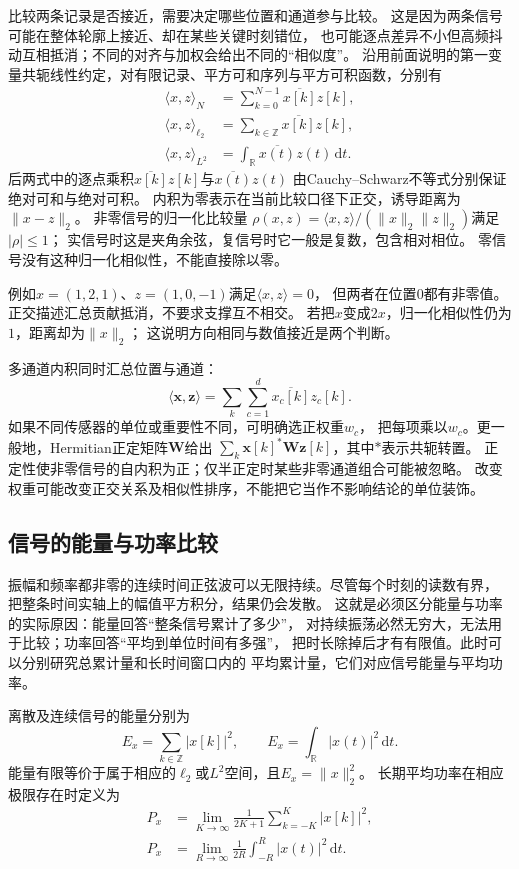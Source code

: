 比较两条记录是否接近，需要决定哪些位置和通道参与比较。
这是因为两条信号可能在整体轮廓上接近、却在某些关键时刻错位，
也可能逐点差异不小但高频抖动互相抵消；不同的对齐与加权会给出不同的“相似度”。
沿用前面说明的第一变量共轭线性约定，对有限记录、平方可和序列与平方可积函数，分别有
\begin{equation}
  \begin{aligned}
    \langle x,z\rangle_N&=\sum_{k=0}^{N-1}\overline{x[k]}z[k],\\
    \langle x,z\rangle_{\ell_2}&=\sum_{k\in\mathbb Z}\overline{x[k]}z[k],\\
    \langle x,z\rangle_{L^2}&=\int_{\mathbb R}\overline{x(t)}z(t)\,\mathrm dt.
  \end{aligned}
  \label{eq:signal-inner-products}
\end{equation}
后两式中的逐点乘积$\overline{x[k]}z[k]$与$\overline{x(t)}z(t)$
由Cauchy--Schwarz不等式分别保证绝对可和与绝对可积。
内积为零表示在当前比较口径下正交，诱导距离为$\|x-z\|_2$。
非零信号的归一化比较量
$\rho(x,z)=\langle x,z\rangle/(\|x\|_2\|z\|_2)$满足$|\rho|\leq1$；
实信号时这是夹角余弦，复信号时它一般是复数，包含相对相位。
零信号没有这种归一化相似性，不能直接除以零。

例如$x=(1,2,1)$、$z=(1,0,-1)$满足$\langle x,z\rangle=0$，
但两者在位置$0$都有非零值。正交描述汇总贡献抵消，不要求支撑互不相交。
若把$x$变成$2x$，归一化相似性仍为$1$，距离却为$\|x\|_2$；
这说明方向相同与数值接近是两个判断。

多通道内积同时汇总位置与通道：
\[
  \langle\bm x,\bm z\rangle
  =\sum_k\sum_{c=1}^d \overline{x_c[k]}z_c[k].
\]
如果不同传感器的单位或重要性不同，可明确选正权重$w_c$，
把每项乘以$w_c$。更一般地，Hermitian正定矩阵$\bm W$给出
$\sum_k\bm x[k]^*\bm W\bm z[k]$，其中$*$表示共轭转置。
正定性使非零信号的自内积为正；仅半正定时某些非零通道组合可能被忽略。
改变权重可能改变正交关系及相似性排序，不能把它当作不影响结论的单位装饰。

\subsection{信号的能量与功率比较}

振幅和频率都非零的连续时间正弦波可以无限持续。尽管每个时刻的读数有界，
把整条时间实轴上的幅值平方积分，结果仍会发散。
这就是必须区分能量与功率的实际原因：能量回答“整条信号累计了多少”，
对持续振荡必然无穷大，无法用于比较；功率回答“平均到单位时间有多强”，
把时长除掉后才有有限值。此时可以分别研究总累计量和长时间窗口内的
平均累计量，它们对应信号能量与平均功率。
\begin{definition}[信号能量与平均功率]
  \label{def:signal-energy-power}
  离散及连续信号的能量分别为
  \[
    E_x=\sum_{k\in\mathbb Z}|x[k]|^2,\qquad
    E_x=\int_{\mathbb R}|x(t)|^2\,\mathrm dt.
  \]
  能量有限等价于属于相应的$\ell_2$或$L^2$空间，且$E_x=\|x\|_2^2$。
  长期平均功率在相应极限存在时定义为
  \begin{align*}
    P_x&=\lim_{K\to\infty}\frac1{2K+1}\sum_{k=-K}^K|x[k]|^2,\\
    P_x&=\lim_{R\to\infty}\frac1{2R}\int_{-R}^R|x(t)|^2\,\mathrm dt.
  \end{align*}
\end{definition}

